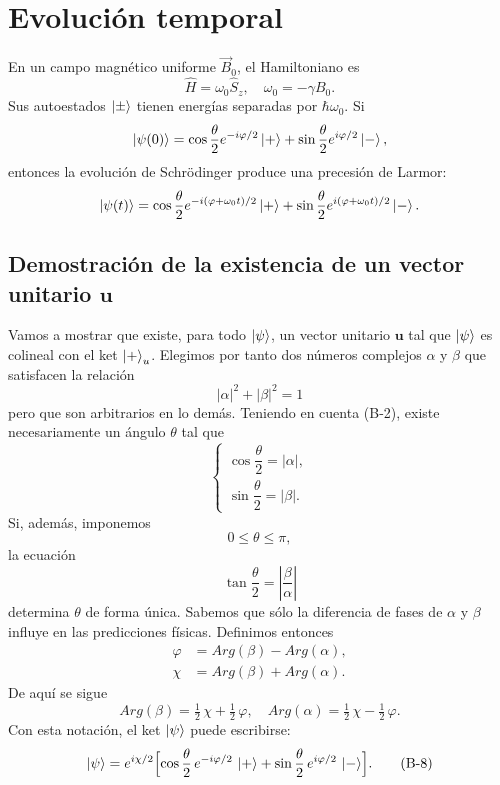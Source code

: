 \documentclass[a4paper,11pt]{article}
\begin{document}
\section{Evolución temporal}
En un campo magnético uniforme $\vec{B}_0$, el Hamiltoniano es
\[
\hat H = \omega_0 \hat S_z,\quad \omega_0 = -\gamma B_0.
\]
Sus autoestados $\ket{\pm}$ tienen energías separadas por $\hbar\omega_0$. Si
\[
\ket{\psi(0)} = \cos\frac{\theta}{2}e^{-i\varphi/2}\ket{+}
                             + \sin\frac{\theta}{2}e^{i\varphi/2}\ket{-},
\]
entonces la evolución de Schrödinger produce una precesión de Larmor:
\[
\ket{\psi(t)}
= \cos\frac{\theta}{2}e^{-i(\varphi+\omega_0 t)/2}\ket{+}
+ \sin\frac{\theta}{2}e^{i(\varphi+\omega_0 t)/2}\ket{-}.
\]

\subsection*{Demostración de la existencia de un vector unitario $\mathbf{u}$}
Vamos a mostrar que existe, para todo $\ket{\psi}$, un vector unitario $\mathbf{u}$ tal que $\ket{\psi}$ es colineal con el ket $\ket{+}_u$. Elegimos por tanto dos números complejos $\alpha$ y $\beta$ que satisfacen la relación
\begin{equation}
|\alpha|^2 + |\beta|^2 = 1
\tag{B-2}
\end{equation}
pero que son arbitrarios en lo demás. Teniendo en cuenta (B-2), existe necesariamente un ángulo $\theta$ tal que
\begin{equation}
\begin{cases}
\cos\dfrac{\theta}{2} = |\alpha|,\\
\sin\dfrac{\theta}{2} = |\beta|.
\end{cases}
\tag{B-3}
\end{equation}
Si, además, imponemos
\begin{equation}
0 \le \theta \le \pi,
\tag{B-4}
\end{equation}
la ecuación
\[
\tan\dfrac{\theta}{2} = \left|\dfrac{\beta}{\alpha}\right|
\]
determina $\theta$ de forma única. Sabemos que sólo la diferencia de fases de $\alpha$ y $\beta$ influye en las predicciones físicas. Definimos entonces
\begin{align}
\varphi &= Arg(\beta) - Arg(\alpha), \tag{B-5}\\
\chi    &= Arg(\beta) + Arg(\alpha). \tag{B-6}
\end{align}
De aquí se sigue
\begin{equation}
    Arg(\beta) = \tfrac12\,\chi + \tfrac12\,\varphi,
    \quad
    Arg(\alpha) = \tfrac12\,\chi - \tfrac12\,\varphi.
\tag{B-7}
\end{equation}
Con esta notación, el ket $\ket{\psi}$ puede escribirse:
\begin{equation}
\ket{\psi}
= e^{i\chi/2}
\Bigl[
\cos\dfrac{\theta}{2}\,e^{-i\varphi/2}\,\ket{+}
+
\sin\dfrac{\theta}{2}\,e^{i\varphi/2}\,\ket{-}
\Bigr].
\tag{B-8}
\end{equation}
\end{document}
